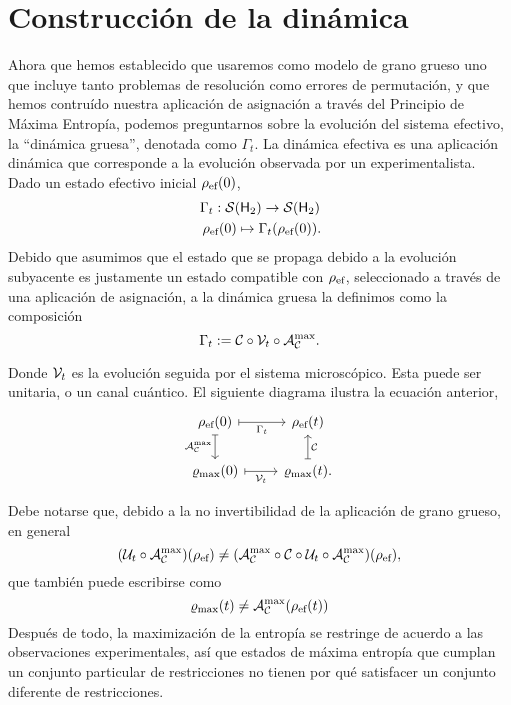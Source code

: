 \section{Construcción de la dinámica}\label{sec:ch2dycon}

Ahora que hemos establecido que usaremos como modelo de grano grueso uno que incluye tanto problemas de resolución como errores de permutación, y que hemos contruído nuestra aplicación de asignación a través del Principio de Máxima Entropía, podemos preguntarnos sobre la evolución del sistema efectivo, la ``dinámica gruesa'', denotada como $\Gamma_t$. La dinámica efectiva es una aplicación dinámica que corresponde a la evolución observada por un experimentalista. Dado un estado efectivo inicial $\rho_{\text{ef}}(0)$,
\begin{gather}
\Gamma_{t}:\mcS(\hilbert_2)\rightarrow \mcS(\hilbert_2)\nonumber\\
\rho_{\ef}(0) \mapsto \Gamma_{t}(\rho_{\ef}(0))\rlap{.}\nonumber
\end{gather}
Debido que asumimos que el estado que se propaga debido a la evolución subyacente es justamente un estado compatible con $\rho_{\text{ef}}$, seleccionado a través de una aplicación de asignación, a la dinámica gruesa la definimos como la composición
\begin{equation}\label{eq:EffectiveDynamics}
\Gamma_t:=\mathcal{C} \circ \mathcal{V}_t \circ \mathcal{A}_{\mathcal{C}}^{\max}.
\end{equation}


Donde $\mathcal{V}_{t}$ es la evolución seguida por el sistema microscópico. Esta puede ser unitaria, o un canal cuántico. El siguiente diagrama ilustra la ecuación anterior,
\[\begin{tikzcd}[arrows={<-|}]
    \rho_{\ef}(0)  & \rho_{\ef}(t) \arrow{l}{\Gamma_{t}} \arrow{d}{\mcC}\\
\varrho_{\max}(0) \arrow{u}{\mcA_{\mcC}^{\max}} & \varrho_{\max}(t). \arrow{l}{\mcV_{t}}
\end{tikzcd}
\]


Debe notarse que, debido a la no invertibilidad de la aplicación de grano grueso, en general
\begin{equation}
    (\mathcal{U}_{t}\circ\mathcal{A}_{\mathcal{C}}^{\max})(\rho_{\text{ef}}) \neq (\mathcal{A}_{\mathcal{C}}^{\max}\circ\mathcal{C} \circ \mathcal{U}_t \circ \mathcal{A}_{\mathcal{C}}^{\max})(\rho_{\text{ef}}),\nonumber
\end{equation}
que también puede escribirse como
\begin{equation}
    \varrho_{\max}(t)\neq\mathcal{A}_{\mathcal{C}}^{\max}(\rho_{\text{ef}}(t))\nonumber
\end{equation}
Después de todo, la maximización de la entropía se restringe de acuerdo a las observaciones experimentales, así que estados de máxima entropía que cumplan un conjunto particular de restricciones no tienen por qué satisfacer un conjunto diferente de restricciones.



